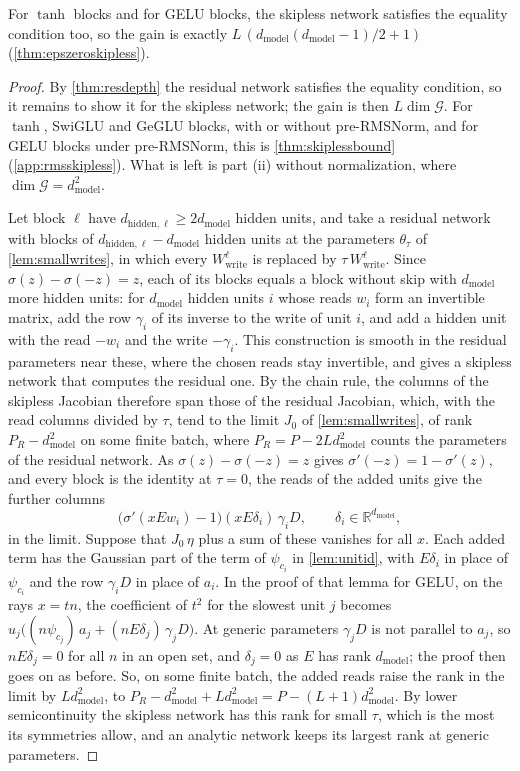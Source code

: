 \documentclass[10pt]{article}
\theoremstyle{definition}
\theoremstyle{remark}
\newcommand{\R}{\mathbb{R}}
\newcommand{\Wwrite}{W_{\mathrm{write}}}
\newcommand{\dm}{d_{\mathrm{model}}}
\newcommand{\G}{\mathcal{G}}
\begin{document}
For $\tanh$ blocks and for GELU blocks, the skipless network satisfies the equality condition too, so the gain is exactly $L\,(\dm(\dm-1)/2 + 1)$ (\cref{thm:epszeroskipless}).


\thmExactGain*

\begin{proof}
By \cref{thm:resdepth} the residual network satisfies the equality condition, so it remains to show it for the skipless network; the gain is then $L\dim\G$. For $\tanh$, SwiGLU and GeGLU blocks, with or without pre-RMSNorm, and for GELU blocks under pre-RMSNorm, this is \cref{thm:skiplessbound} (\cref{app:rmsskipless}). What is left is part (ii) without normalization, where $\dim\G = \dm^2$.

Let block $\ell$ have $d_{\mathrm{hidden},\ell} \ge 2\dm$ hidden units, and take a residual network with blocks of $d_{\mathrm{hidden},\ell} - \dm$ hidden units at the parameters $\theta_\tau$ of \cref{lem:smallwrites}, in which every $\Wwrite^{\ell}$ is replaced by $\tau\,\Wwrite^{\ell}$. Since $\sigma(z) - \sigma(-z) = z$, each of its blocks equals a block without skip with $\dm$ more hidden units: for $\dm$ hidden units $i$ whose reads $w_i$ form an invertible matrix, add the row $\gamma_i$ of its inverse to the write of unit $i$, and add a hidden unit with the read $-w_i$ and the write $-\gamma_i$. This construction is smooth in the residual parameters near these, where the chosen reads stay invertible, and gives a skipless network that computes the residual one. By the chain rule, the columns of the skipless Jacobian therefore span those of the residual Jacobian, which, with the read columns divided by $\tau$, tend to the limit $J_0$ of \cref{lem:smallwrites}, of rank $P_R - \dm^2$ on some finite batch, where $P_R = P - 2L\dm^2$ counts the parameters of the residual network. As $\sigma(z) - \sigma(-z) = z$ gives $\sigma'(-z) = 1 - \sigma'(z)$, and every block is the identity at $\tau = 0$, the reads of the added units give the further columns
\[
\big(\sigma'(xEw_i) - 1\big)(xE\delta_i)\,\gamma_iD,\qquad \delta_i \in \R^{\dm},
\]
in the limit. Suppose that $J_0\,\eta$ plus a sum of these vanishes for all $x$. Each added term has the Gaussian part of the term of $\psi_{c_i}$ in \cref{lem:unitid}, with $E\delta_i$ in place of $\psi_{c_i}$ and the row $\gamma_iD$ in place of $a_i$. In the proof of that lemma for GELU, on the rays $x = tn$, the coefficient of $t^2$ for the slowest unit $j$ becomes $u_j\big((n\psi_{c_j})\,a_j + (nE\delta_j)\,\gamma_jD\big)$. At generic parameters $\gamma_jD$ is not parallel to $a_j$, so $nE\delta_j = 0$ for all $n$ in an open set, and $\delta_j = 0$ as $E$ has rank $\dm$; the proof then goes on as before. So, on some finite batch, the added reads raise the rank in the limit by $L\dm^2$, to $P_R - \dm^2 + L\dm^2 = P - (L+1)\dm^2$. By lower semicontinuity the skipless network has this rank for small $\tau$, which is the most its symmetries allow, and an analytic network keeps its largest rank at generic parameters.
\end{proof}
\end{document}
